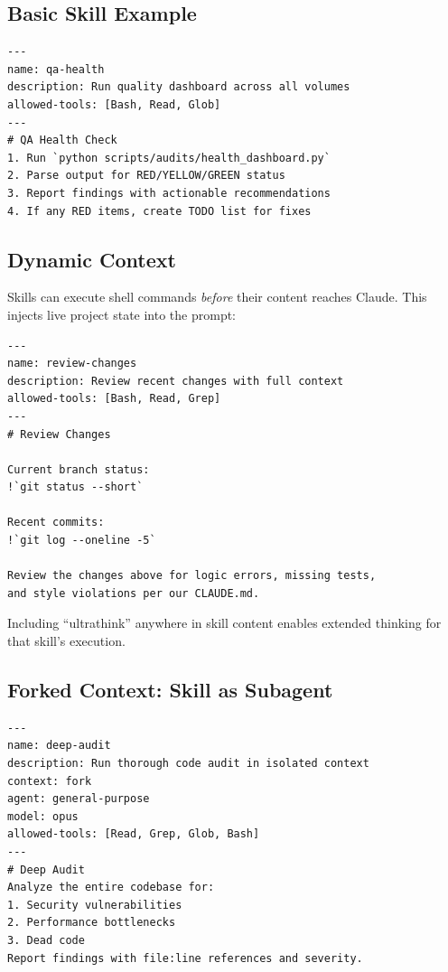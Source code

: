 \subsection{Basic Skill Example}

\begin{verbatim}
---
name: qa-health
description: Run quality dashboard across all volumes
allowed-tools: [Bash, Read, Glob]
---
# QA Health Check
1. Run `python scripts/audits/health_dashboard.py`
2. Parse output for RED/YELLOW/GREEN status
3. Report findings with actionable recommendations
4. If any RED items, create TODO list for fixes
\end{verbatim}

\subsection{Dynamic Context}


Skills can execute shell commands \emph{before} their content reaches Claude.
This injects live project state into the prompt:

\begin{verbatim}
---
name: review-changes
description: Review recent changes with full context
allowed-tools: [Bash, Read, Grep]
---
# Review Changes

Current branch status:
!`git status --short`

Recent commits:
!`git log --oneline -5`

Review the changes above for logic errors, missing tests,
and style violations per our CLAUDE.md.
\end{verbatim}

Including ``ultrathink'' anywhere in skill content enables extended thinking
for that skill's execution.

\subsection{Forked Context: Skill as Subagent}


\begin{verbatim}
---
name: deep-audit
description: Run thorough code audit in isolated context
context: fork
agent: general-purpose
model: opus
allowed-tools: [Read, Grep, Glob, Bash]
---
# Deep Audit
Analyze the entire codebase for:
1. Security vulnerabilities
2. Performance bottlenecks
3. Dead code
Report findings with file:line references and severity.
\end{verbatim}

